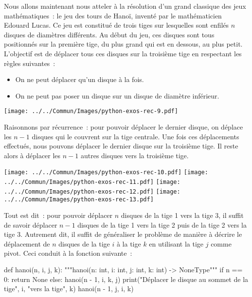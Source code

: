 \documentclass{magnolia}
\begin{document}
Nous allons maintenant nous atteler à la résolution d'un grand classique des jeux
mathématiques~: le jeu des tours de Hanoï, inventé par le mathématicien
Edouard Lucas. Ce jeu est constitué de trois tiges sur lesquelles sont enfilés $n$
disques de diamètres différents. Au début du jeu, ces disques sont tous positionnés
sur la première tige, du plus grand qui est en dessous, au plus petit. L'objectif
est de déplacer tous ces disques sur la troisième tige en respectant les règles
suivantes~:
\begin{itemize}
\item On ne peut déplacer qu'un disque à la fois.
\item On ne peut pas poser un disque sur un disque de diamètre inférieur.
\end{itemize}
\begin{center}
\texttt{[image: ../../Commun/Images/python-exos-rec-9.pdf]}
\end{center}
Raisonnons par récurrence~: pour pouvoir déplacer le dernier disque, on déplace
les $n-1$ disques qui le couvrent sur la tige centrale. Une fois ces
déplacements effectués, nous pouvons déplacer le dernier disque sur la troisième
tige. Il reste alors à déplacer les $n-1$ autres disques vers la troisième tige.
\begin{center}
\texttt{[image: ../../Commun/Images/python-exos-rec-10.pdf]}
\hspace{1cm}
\texttt{[image: ../../Commun/Images/python-exos-rec-11.pdf]}
\hspace{1cm}
\texttt{[image: ../../Commun/Images/python-exos-rec-12.pdf]}
\hspace{1cm}
\texttt{[image: ../../Commun/Images/python-exos-rec-13.pdf]}
\end{center}
Tout est dit~: pour pouvoir déplacer $n$ disques de la tige 1 vers la tige 3, il suffit de
savoir déplacer $n-1$ disques de la tige 1 vers la tige 2 puis de la tige 2 vers la tige 3.
Autrement dit, il suffit de généraliser le problème de manière à décrire le déplacement
de $n$ disques de la tige $i$ à la tige $k$ en utilisant la tige $j$ comme pivot. Ceci
conduit à la fonction suivante~:
\begin{pythoncodeline}
def hanoi(n, i, j, k):
    """hanoi(n: int, i: int, j: int, k: int) -> NoneType"""
    if n == 0:
        return None
    else:
        hanoi(n - 1, i, k, j)
        print("Déplacer le disque au sommet de la tige", i, "vers la tige", k)
        hanoi(n - 1, j, i, k)
\end{pythoncodeline}
\end{document}
